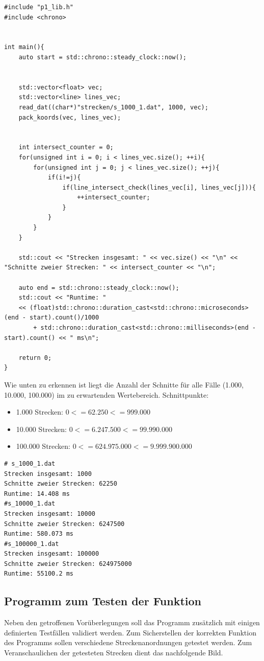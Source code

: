 \documentclass[12pt]{scrartcl}
\begin{document}
\begin{lstlisting}[style=CStyle, caption={strecken.cpp: Aufgruf der Bibliotheksfunktionen},captionpos=b]
#include "p1_lib.h"
#include <chrono>


int main(){
    auto start = std::chrono::steady_clock::now();


    std::vector<float> vec;
    std::vector<line> lines_vec;
    read_dat((char*)"strecken/s_1000_1.dat", 1000, vec);
    pack_koords(vec, lines_vec);


    int intersect_counter = 0;
    for(unsigned int i = 0; i < lines_vec.size(); ++i){
        for(unsigned int j = 0; j < lines_vec.size(); ++j){
            if(i!=j){
                if(line_intersect_check(lines_vec[i], lines_vec[j])){
                    ++intersect_counter;
                }
            }
        }
    }

    std::cout << "Strecken insgesamt: " << vec.size() << "\n" << "Schnitte zweier Strecken: " << intersect_counter << "\n";

    auto end = std::chrono::steady_clock::now();     
    std::cout << "Runtime: " 
    << (float)std::chrono::duration_cast<std::chrono::microseconds>(end - start).count()/1000 
        + std::chrono::duration_cast<std::chrono::milliseconds>(end - start).count() << " ms\n";

    return 0;
}
\end{lstlisting}

Wie unten zu erkennen ist liegt die Anzahl der Schnitte für alle Fälle (1.000, 10.000, 100.000) im zu erwartenden Wertebereich.
Schnittpunkte:    
\begin{itemize}
    \item 1.000 Strecken: $0<= 62.250 <= 999.000$
    \item 10.000 Strecken: $0<= 6.247.500 <= 99.990.000$
    \item 100.000 Strecken: $0<= 624.975.000 <= 9.999.900.000$
\end{itemize}


\begin{lstlisting}[style=Terminal, caption={testing.cpp: Ausgabe Konsole},captionpos=b]
# s_1000_1.dat
Strecken insgesamt: 1000
Schnitte zweier Strecken: 62250
Runtime: 14.408 ms
#s_10000_1.dat
Strecken insgesamt: 10000
Schnitte zweier Strecken: 6247500
Runtime: 580.073 ms
#s_100000_1.dat
Strecken insgesamt: 100000
Schnitte zweier Strecken: 624975000
Runtime: 55100.2 ms
\end{lstlisting}


\subsection{Programm zum Testen der Funktion}
Neben den getroffenen Vorüberlegungen soll das Programm zusätzlich mit einigen definierten Testfällen validiert werden.
Zum Sicherstellen der korrekten Funktion des Programms sollen verschiedene Streckenanordnungen getestet werden.
Zum Veranschaulichen der getesteten Strecken dient das nachfolgende Bild.\\
\end{document}
